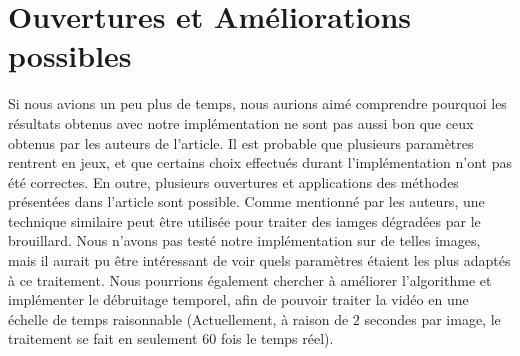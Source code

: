 \documentclass[twoside]{article}
\begin{document}
\section{Ouvertures et Améliorations possibles}
Si nous avions un peu plus de temps, nous aurions aimé comprendre pourquoi les résultats obtenus avec notre implémentation ne sont pas aussi bon que ceux obtenus par les auteurs de l'article. Il est probable que plusieurs paramètres rentrent en jeux, et que certains choix effectués durant l'implémentation n'ont pas été correctes. En outre, plusieurs ouvertures et applications des méthodes présentées dans l'article sont possible. Comme mentionné par les auteurs, une technique similaire peut être utilisée pour traiter des iamges dégradées par le brouillard. Nous n'avons pas testé notre implémentation sur de telles images, mais il aurait pu être intéressant de voir quels paramètres étaient les plus adaptés à ce traitement. Nous pourrions également chercher à améliorer l'algorithme et implémenter le débruitage temporel, afin de pouvoir traiter la vidéo en une échelle de temps raisonnable (Actuellement, à raison de $2$ secondes par image, le traitement se fait en seulement $60$ fois le temps réel).

\end{document}
